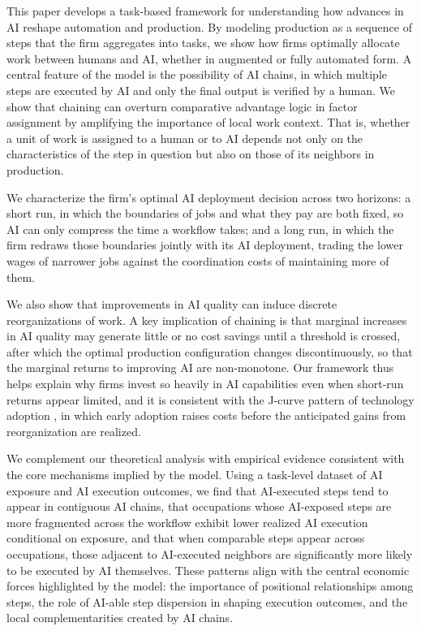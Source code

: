 This paper develops a task-based framework for understanding how advances in AI reshape automation and production.
By modeling production as a sequence of steps that the firm aggregates into tasks, we show how firms optimally allocate work between humans and AI, whether in augmented or fully automated form.
A central feature of the model is the possibility of AI chains, in which multiple steps are executed by AI and only the final output is verified by a human.
We show that chaining can overturn comparative advantage logic in factor assignment by amplifying the importance of local work context.
That is, whether a unit of work is assigned to a human or to AI depends not only on the characteristics of the step in question but also on those of its neighbors in production.

We characterize the firm's optimal AI deployment decision across two horizons: a short run, in which the boundaries of jobs and what they pay are both fixed, so AI can only compress the time a workflow takes; and a long run, in which the firm redraws those boundaries jointly with its AI deployment, trading the lower wages of narrower jobs against the coordination costs of maintaining more of them.

We also show that improvements in AI quality can induce discrete reorganizations of work.
A key implication of chaining is that marginal increases in AI quality may generate little or no cost savings until a threshold is crossed, after which the optimal production configuration changes discontinuously, so that the marginal returns to improving AI are non-monotone.
Our framework thus helps explain why firms invest so heavily in AI capabilities even when short-run returns appear limited, and it is consistent with the J-curve pattern of technology adoption \citep{brynjolfsson2021productivity}, in which early adoption raises costs before the anticipated gains from reorganization are realized.

We complement our theoretical analysis with empirical evidence consistent with the core mechanisms implied by the model.
Using a task-level dataset of AI exposure and AI execution outcomes, we find that AI-executed steps tend to appear in contiguous AI chains, that occupations whose AI-exposed steps are more fragmented across the workflow exhibit lower realized AI execution conditional on exposure, and that when comparable steps appear across occupations, those adjacent to AI-executed neighbors are significantly more likely to be executed by AI themselves.
These patterns align with the central economic forces highlighted by the model: the importance of positional relationships among steps, the role of AI-able step dispersion in shaping execution outcomes, and the local complementarities created by AI chains.
